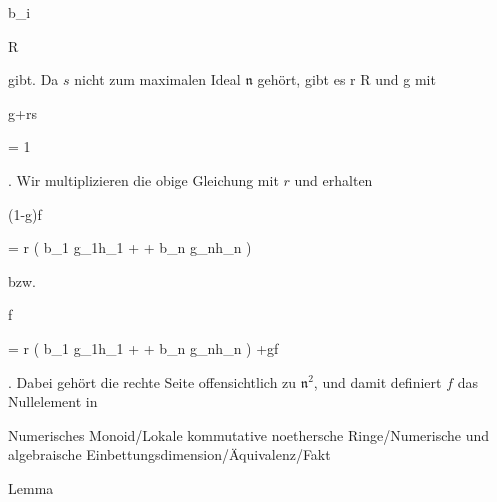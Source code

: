 {{{ b_i
}

{ \in }{ R
}

{  }{
}

{    }{
}

{   }{
}

}
{}{}{}
gibt. Da $s$ nicht zum maximalen Ideal ${\mathfrak n}$  gehört, gibt es
\mathkor {} {r \in R} {und} {g } {}
mit


\mavergleichskette

{\vergleichskette

{g+rs
}

{ = }{ 1
}

{  }{
}

{    }{
}

{   }{
}

}
{}{}{.}
Wir multiplizieren die obige Gleichung mit $r$ und erhalten


\mavergleichskettedisp

{\vergleichskette

{ (1-g)f
}

{ =} { r \left(  b_1 g_1h_1 + \cdots +  b_n g_nh_n  \right)
}

{ } {
}

{ } {
}

{ } {
}

}
{}{}{}
bzw.


\mavergleichskettedisp

{\vergleichskette

{ f
}

{ =} { r \left(  b_1 g_1h_1 + \cdots +  b_n g_nh_n  \right)  +gf
}

{ } {
}

{ } {
}

{ } {
}

}
{}{}{.}
Dabei gehört die rechte Seite offensichtlich zu ${\mathfrak n}^2$, und damit definiert $f$ das Nullelement in



}



{Numerisches Monoid/Lokale kommutative noethersche Ringe/Numerische und algebraische Einbettungsdimension/Äquivalenz/Fakt}

{Lemma}

{}

